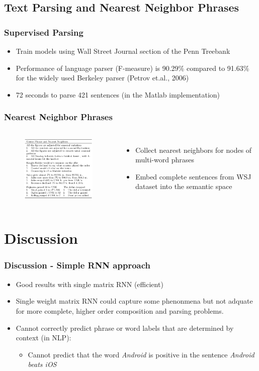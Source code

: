 \documentclass{beamer}
\begin{document}
\subsection{Text Parsing and Nearest Neighbor Phrases}
\frame
{
  \frametitle{Supervised Parsing}
  \begin{itemize}
  	\item Train models using Wall Street Journal section of the Penn Treebank
  	\item Performance of language parser (F-measure) is 90.29\% compared to 91.63\% for the widely used Berkeley parser (Petrov et.al., 2006)
  	\item 72 seconds to parse 421 sentences (in the Matlab implementation)
  \end{itemize}
}
\frame
{
	\frametitle{Nearest Neighbor Phrases}
	\begin{columns}
	\begin{figure}[ht]  
		\begin{center}
			\includegraphics[width=2.5in]{images/ex4.png}   
		\end{center}   
	\end{figure}
	\begin{itemize}
		\item Collect nearest neighbors for nodes of multi-word phrases
		\item Embed complete sentences from WSJ dataset into the semantic space
	\end{itemize}
	\end{columns}
}
\section{Discussion}
\frame
{
	\frametitle{Discussion - Simple RNN approach}
	\begin{itemize}
		\item Good results with single matrix RNN (efficient)
		\item Single weight matrix RNN could capture some phenonmena but not adquate for more complete, higher order composition and parsing problems.
		\item Cannot correctly predict phrase or word labels that are determined by context (in NLP): 
			\begin{itemize}
				\item Cannot predict that the word \textit{Android} is positive in the sentence \textit{Android beats iOS}
			\end{itemize}
	\end{itemize}
}
\end{document}
